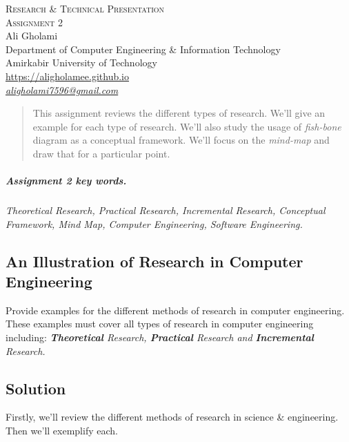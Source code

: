 \documentclass[12pt]{article}
\numberwithin{equation}{section}
\numberwithin{table}{section}
\numberwithin{figure}{section}
\begin{document}

\begin{center}
\textsc{\Large Research \& Technical Presentation} \\[2pt]
	\textsc{\large Assignment 2}\\
	\vspace{0.5cm}
  Ali Gholami \\[6pt]
  Department of Computer Engineering \& Information Technology\\
  Amirkabir University of Technology  \\[6pt]
  \def\UrlFont{\em}
  \url{https://aligholamee.github.io}\\
    \href{mailto:aligholami7596@gmail.com}{\textit{aligholami7596@gmail.com}}
\end{center}

\begin{abstract}
This assignment reviews the different types of research. We'll give an example for each type of research. We'll also study the usage of \textit{fish-bone} diagram as a conceptual framework. We'll focus on the \textit{mind-map} and draw that for a particular point.
\end{abstract}

\subparagraph{Assignment 2 key words.} \textit{Theoretical Research, Practical Research, Incremental Research, Conceptual Framework, Mind Map, Computer Engineering, Software Engineering.}

\subsection{An Illustration of Research in Computer Engineering}

Provide examples for the different methods of research in computer engineering. These examples must cover all types of research in computer engineering including:
\textit{\textbf{Theoretical} Research, \textbf{Practical} Research and \textbf{Incremental} Research.} 

\subsection*{Solution}

Firstly, we'll review the different methods of research in science \& engineering. Then we'll exemplify each. 
\end{document}
